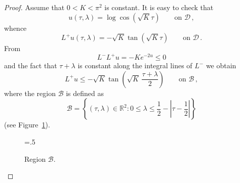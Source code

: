 \documentclass[10pt]{amsart}
\newcommand{\bbR}{\mathbb{R}}      %
\begin{document}
\begin{proof}
Assume that $0<K<\pi^2$ is constant. It is easy to check that
\begin{equation}
u(\tau,\lambda) = \log \cos \left( \sqrt{K} \tau \right) \qquad \text{on } \mathcal{D} \, ,
\end{equation}
whence
\begin{equation}
L^+u(\tau,\lambda) = - \sqrt{K} \tan \left( \sqrt{K} \tau \right) \qquad \text{on } \mathcal{D} \, .
\end{equation}
From
\begin{equation} \label{main2}
L^- L^+ u = - K e^{-2u} \leq 0
\end{equation}
and the fact that $\tau + \lambda$ is constant along the integral lines of $L^-$ we obtain
\begin{equation} 
L^+ u \leq - \sqrt{K} \tan \left( \sqrt{K} \, \frac{\tau + \lambda}2 \right) \qquad \text{on } \mathcal{B} \, ,
\end{equation}
where the region $\mathcal{B}$ is defined as
\begin{equation}
\mathcal{B} = \left\{ (\tau,\lambda) \in \bbR^2 : 0 \leq \lambda \leq \frac12 - \left|\tau-\frac12\right| \right\}
\end{equation}
(see Figure~\ref{Domain2}). 

\begin{figure}[h!]
\begin{center}
\epsfxsize=.5\textwidth
\leavevmode
{}
\end{center}
\caption{Region $\mathcal{B}$.} \label{Domain2}
\end{figure}


\end{proof}
\end{document}
